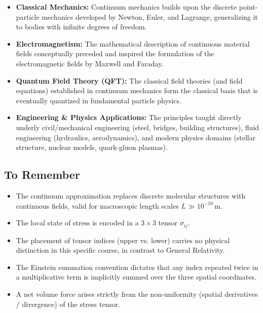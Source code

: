\begin{itemize}
  \item \textbf{Classical Mechanics:} Continuum mechanics builds upon the discrete point-particle mechanics developed by Newton, Euler, and Lagrange, generalizing it to bodies with infinite degrees of freedom.
  \item \textbf{Electromagnetism:} The mathematical description of continuous material fields conceptually preceded and inspired the formulation of the electromagnetic fields by Maxwell and Faraday.
  \item \textbf{Quantum Field Theory (QFT):} The classical field theories (and field equations) established in continuum mechanics form the classical basis that is eventually quantized in fundamental particle physics.
  \item \textbf{Engineering \& Physics Applications:} The principles taught directly underly civil/mechanical engineering (steel, bridges, building structures), fluid engineering (hydraulics, aerodynamics), and modern physics domains (stellar structure, nuclear models, quark-gluon plasmas).
\end{itemize}

\subsection*{To Remember}

\begin{itemize}
  \item The continuum approximation replaces discrete molecular structures with continuous fields, valid for macroscopic length scales $L \gg 10^{-10}\,\text{m}$.
  \item The local state of stress is encoded in a $3 \times 3$ tensor $\sigma_{ij}$.
  \item The placement of tensor indices (upper vs. lower) carries no physical distinction in this specific course, in contrast to General Relativity.
  \item The Einstein summation convention dictates that any index repeated twice in a multiplicative term is implicitly summed over the three spatial coordinates.
  \item A net volume force arises strictly from the non-uniformity (spatial derivatives / divergence) of the stress tensor.
\end{itemize}

